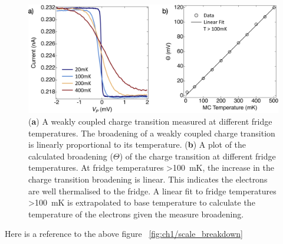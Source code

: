 \begin{figure}[ht]
  \begin{center}
    \includegraphics[width=1.0\textwidth]{figures/ch1/crop_PosterFiguresMaster.005.png}
    \caption[Calculating the electron temperature]{\label{fig:ch1/electron_temp} 
    (\textbf{a}) A weakly coupled charge transition measured at different fridge temperatures. The broadening of a weakly coupled charge transition is linearly proportional to its temperature. (\textbf{b}) A plot of the calculated broadening ($\Theta$) of the charge transition at different fridge temperatures. At fridge temperatures \qty{>100}{mK}, the increase in the charge transition broadening is linear. This indicates the electrons are well thermalised to the fridge. A linear fit to fridge temperatures \qty{>100}{mK} is extrapolated to base temperature to calculate the temperature of the electrons given the measure broadening. 
      }
  \end{center}
\end{figure}


Here is a reference to the above figure ~\ref{fig:ch1/scale_breakdown}